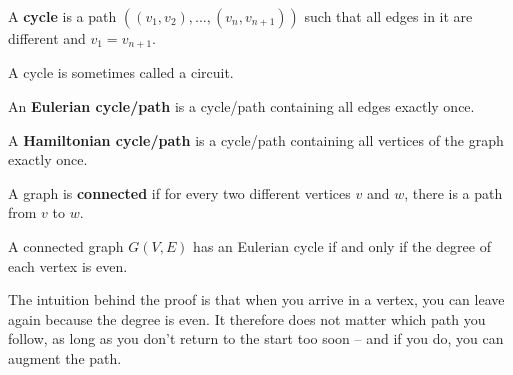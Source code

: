 \begin{definition}[Cycle]
  \textup{A \textbf{cycle} is a path
    $((v_1,v_2),...,(v_n,v_{n+1}))$ such that all edges in it are
different and $v_{1} = v_{n+1}$.}
\end{definition}

A cycle is sometimes called a circuit.


\begin{definition}
  \textup{An \textbf{Eulerian cycle/path} is a cycle/path
containing all edges exactly once.}
\end{definition}

\begin{definition}
  \textup{ A \textbf{Hamiltonian cycle/path} is a cycle/path containing all
vertices of the graph exactly once.}
\end{definition}


\begin{definition}
  \textup{ A graph is \textbf{connected} if for every two different
vertices $v$ and $w$, there is a path from $v$ to $w$.}
\end{definition}

\begin{theorem}
A connected graph $G(V,E)$ has an Eulerian cycle if and only if the degree of
each vertex is even.
\end{theorem}
The intuition behind the proof is that when you arrive in a vertex,
you can leave again because the degree is even. It therefore does not
matter which path you follow, as long as you don't return to the
start too soon -- and if you do, you can augment the path.

